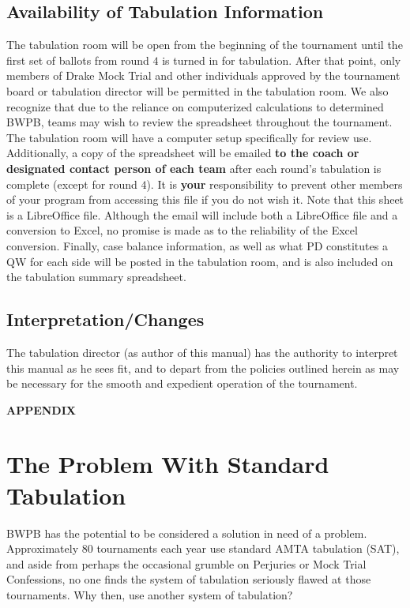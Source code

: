 \documentclass{article}
\begin{document}
\subsection{Availability of Tabulation Information}
The tabulation room will be open from the beginning of the tournament until the first set of ballots from round $4$ is turned in for tabulation.  After that point, only members of Drake Mock Trial and other individuals approved by the tournament board or tabulation director will be permitted in the tabulation room.  We also recognize that due to the reliance on computerized calculations to determined BWPB, teams may wish to review the spreadsheet throughout the tournament.  The tabulation room will have a computer setup specifically for review use.  Additionally, a copy of the spreadsheet will be emailed \textbf{to the coach or designated contact person of each team} after each round's tabulation is complete (except for round $4$). It is \textbf{your} responsibility to prevent other members of your program from accessing this file if you do not wish it. Note that this sheet is a LibreOffice file. Although the email will include both a LibreOffice file and a conversion to Excel, no promise is made as to the reliability of the Excel conversion. Finally, case balance information, as well as what PD constitutes a QW for each side will be posted in the tabulation room, and is also included on the tabulation summary spreadsheet.
\subsection{Interpretation/Changes}
The tabulation director (as author of this manual) has the authority to interpret this manual as he sees fit, and to depart from the policies outlined herein as may be necessary for the smooth and expedient operation of the tournament.
\pagebreak
\appendix
\begin{center}
      {\bf APPENDIX}
    \end{center}
\section{The Problem With Standard Tabulation}
BWPB has the potential to be considered a solution in need of a problem.  Approximately 80 tournaments each year use standard AMTA tabulation (SAT), and aside from perhaps the occasional grumble on Perjuries or Mock Trial Confessions, no one finds the system of tabulation seriously flawed at those tournaments.  Why then, use another system of tabulation?
\end{document}

